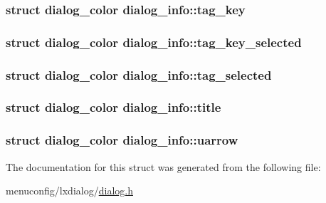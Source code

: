 \hypertarget{structdialog__info_a7393a79c9edb129d5c8c1281e78e11fc}{
\subsubsection[{tag\-\_\-key}]{\setlength{\rightskip}{0pt plus 5cm}struct {\bf dialog\-\_\-color} dialog\-\_\-info\-::tag\-\_\-key}}\label{structdialog__info_a7393a79c9edb129d5c8c1281e78e11fc}
\hypertarget{structdialog__info_afd71be0d9e5b567c771cc3602f7de398}{
\subsubsection[{tag\-\_\-key\-\_\-selected}]{\setlength{\rightskip}{0pt plus 5cm}struct {\bf dialog\-\_\-color} dialog\-\_\-info\-::tag\-\_\-key\-\_\-selected}}\label{structdialog__info_afd71be0d9e5b567c771cc3602f7de398}
\hypertarget{structdialog__info_ab888320078b48b63299a74e8fa42f683}{
\subsubsection[{tag\-\_\-selected}]{\setlength{\rightskip}{0pt plus 5cm}struct {\bf dialog\-\_\-color} dialog\-\_\-info\-::tag\-\_\-selected}}\label{structdialog__info_ab888320078b48b63299a74e8fa42f683}
\hypertarget{structdialog__info_acd8d65b2193ac08bff8b6deb3d2b08da}{
\subsubsection[{title}]{\setlength{\rightskip}{0pt plus 5cm}struct {\bf dialog\-\_\-color} dialog\-\_\-info\-::title}}\label{structdialog__info_acd8d65b2193ac08bff8b6deb3d2b08da}
\hypertarget{structdialog__info_ab378bb8b1f9125eb865a564672025ee4}{
\subsubsection[{uarrow}]{\setlength{\rightskip}{0pt plus 5cm}struct {\bf dialog\-\_\-color} dialog\-\_\-info\-::uarrow}}\label{structdialog__info_ab378bb8b1f9125eb865a564672025ee4}


The documentation for this struct was generated from the following file\-:\begin{DoxyCompactItemize}
\item 
menuconfig/lxdialog/\hyperlink{dialog_8h}{dialog.\-h}\end{DoxyCompactItemize}
